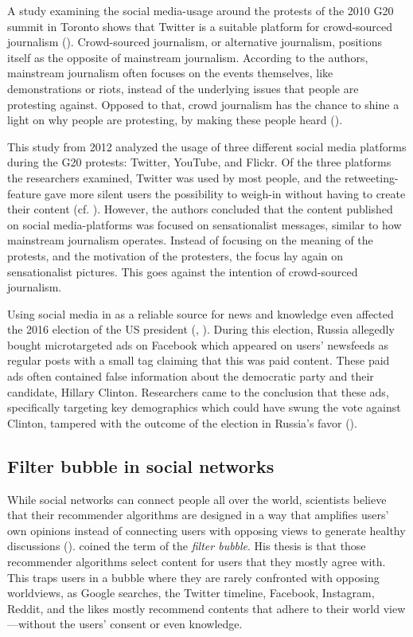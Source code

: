 A study examining the social media-usage around the protests of the 2010 G20 summit in Toronto shows that Twitter is a suitable platform for crowd-sourced journalism (\cite{poell2012twitter}). Crowd-sourced journalism, or alternative journalism, positions itself as the opposite of mainstream journalism. According to the authors, mainstream journalism often focuses on the events themselves, like demonstrations or riots, instead of the underlying issues that people are protesting against. Opposed to that, crowd journalism has the chance to shine a light on why people are protesting, by making these people heard (\cite[698]{poell2012twitter}). 

This study from 2012 analyzed the usage of three different social media platforms during the G20 protests: Twitter, YouTube, and Flickr. Of the three platforms the researchers examined, Twitter was used by most people, and the retweeting-feature gave more silent users the possibility to weigh-in without having to create their content (cf. \cite[709]{poell2012twitter}). However, the authors concluded that the content published on social media-platforms was focused on sensationalist messages, similar to how mainstream journalism operates. Instead of focusing on the meaning of the protests, and the motivation of the protesters, the focus lay again on sensationalist pictures. This goes against the intention of crowd-sourced journalism.

Using social media in as a reliable source for news and knowledge even affected the 2016 election of the US president (\cite{duttSenatorWeSell2018}, \cite{ribeiroMicrotargetingSociallyDivisive2019}). During this election, Russia allegedly bought microtargeted ads on Facebook which appeared on users' newsfeeds as regular posts with a small tag claiming that this was paid content. These paid ads often contained false information about the democratic party and their candidate, Hillary Clinton. Researchers came to the conclusion that these ads, specifically targeting key demographics which could have swung the vote against Clinton, tampered with the outcome of the election in Russia's favor (\cite{duttSenatorWeSell2018}).

\subsection{Filter bubble in social networks}
While social networks can connect people all over the world, scientists believe that their recommender algorithms are designed in a way that amplifies users' own opinions instead of connecting users with opposing views to generate healthy discussions (\cite{pariser2011filter}). \citeauthor{pariser2011filter} coined the term of the \emph{filter bubble}. His thesis is that those recommender algorithms select content for users that they mostly agree with. This traps users in a bubble where they are rarely confronted with opposing worldviews, as Google searches, the Twitter timeline, Facebook, Instagram, Reddit, and the likes mostly recommend contents that adhere to their world view---without the users' consent or even knowledge.

